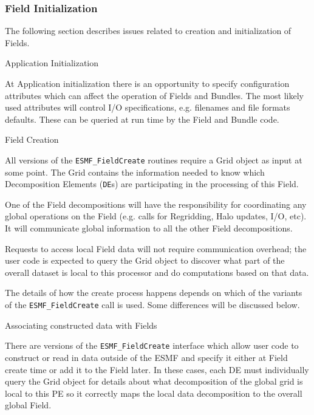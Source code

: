 \subsubsection{Field Initialization}

The following section describes issues related to
creation and initialization of Fields.

\begin{description}

\item{Application Initialization}
 
At Application initialization there is an opportunity to 
specify configuration attributes which can affect the
operation of Fields and Bundles.  The most likely used
attributes will control I/O specifications, e.g. 
filenames and file formats defaults.  These can be
queried at run time by the Field and Bundle code.

\item{Field Creation}

All versions of the {\tt ESMF\_FieldCreate} 
routines require a Grid object as input at some point.
The Grid contains the information needed to know which 
Decomposition Elements ({\tt DE}s) are participating in 
the processing of this Field.  

One of the Field decompositions
will have the responsibility for coordinating
any global operations on the Field (e.g. calls for Regridding,
Halo updates, I/O, etc).  It will communicate global information
to all the other Field decompositions.

Requests to access local Field data will not require 
communication overhead; the user code is expected to
query the Grid object to discover what part of the
overall dataset is local to this processor and do
computations based on that data.

The details of how the create process happens depends 
on which of the 
variants of the {\tt ESMF\_FieldCreate} call is used.
Some differences will be discussed below.

\item{Associating constructed data with Fields}

There are versions of the {\tt ESMF\_FieldCreate} interface
which allow user code to construct or read in data
outside of the ESMF and specify it either at Field create
time or add it to the Field later.  
In these cases, each DE must individually query the Grid object 
for details about what decomposition of the global grid is local 
to this PE so it correctly maps the local data decomposition
to the overall global Field.


\end{description}
